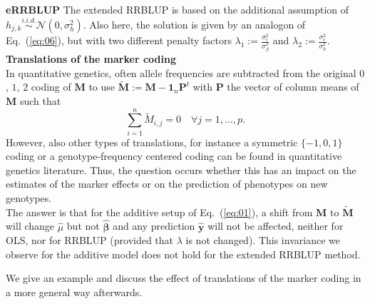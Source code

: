 \documentclass{bmcart}
\newcommand{\M}{\mathbf{M}}
\newcommand{\0}{\mathbf{0}}
\renewcommand{\P}{\mathbf{P}}
\begin{document}
{\bf eRRBLUP}
The extended RRBLUP is based on the additional assumption of $h_{j,k }\stackrel{i.i.d.}{\sim} \mathcal{N}(0,\sigma_h^2 )$. Also here, the solution is given by an analogon of Eq.~(\ref{eq:06}), but with two different penalty factors $\lambda_1:=\frac{\sigma_\epsilon^2}{\sigma_\beta^2}$ and $\lambda_2:=\frac{\sigma_\epsilon^2}{\sigma_h^2}$.
\vspace{0.4cm}\\
{\bf Translations of the marker coding}\vspace{0.2cm}\\
In quantitative genetics, often allele frequencies are subtracted from the original $0$, $1$, $2$ coding of $\M$ to 
use $\tilde{\M}:=\M-\mathbf{1}_n\P^t$ with $\P$ the vector of column means of $\M$ such that 
$$\sum_{i=1}^n \tilde{M}_{i,j} = 0\quad \forall j =1,\dots,p.$$ 
However, also other types of translations, for instance a symmetric $\{-1,0,1\}$ coding or a genotype-frequency centered coding \cite{alvarez2007unified} can be found in quantitative genetics literature. Thus, the question occurs whether this has an impact on the estimates of the marker effects or on the prediction of phenotypes on new genotypes. \\

The answer is that for the additive setup of Eq.~(\ref{eq:01}), a shift from $\M$ to $\tilde{\M}$ will change $\hat{\mu}$ but not $\hat{\bm{\beta}}$ and any prediction $\hat{\mathbf{y}}$ will not be affected, neither for OLS, nor for RRBLUP (provided that $\lambda$ is not changed). This invariance we observe for the additive model does not hold for the extended RRBLUP method.

We give an example and discuss the effect of translations of the marker coding in a more general way afterwards. \\
\end{document}
